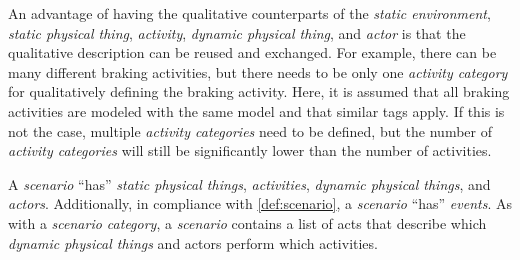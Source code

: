 
An advantage of having the qualitative counterparts of the \textit{static environment}, \cstartb \textit{static physical thing}\cendb, \textit{activity}, \cstartb \textit{dynamic physical thing}, \cendb and \textit{actor} is that the qualitative description can be reused and exchanged. For example, there can be many different braking activities, but there needs to be only one \textit{activity category} for qualitatively defining the braking activity. Here, it is assumed that all braking activities are modeled with the same model and that similar tags apply. If this is not the case, multiple \textit{activity categories} need to be defined, but the number of \textit{activity categories} will still be significantly lower than the number of activities.

A \textit{scenario} ``has'' \cstartc\textit{static physical things}\cendc, \textit{activities}, \cstartb \textit{dynamic physical things}, \cendb and \textit{actors}. 
Additionally, in compliance with \cref{def:scenario}, a \textit{scenario} ``has'' \textit{events}. 
As with a \textit{scenario category}, a \textit{scenario} contains a list of acts that describe which \cstartb \textit{dynamic physical things} and \cendb actors perform which activities.
